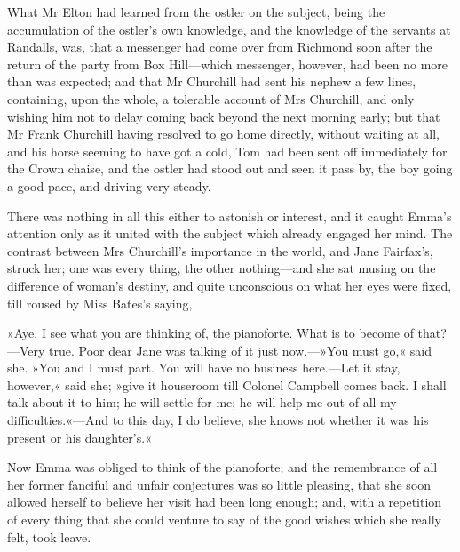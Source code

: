 What Mr Elton had learned from the ostler on the subject, being the accumulation of the ostler's own knowledge, and the knowledge of the servants at Randalls, was, that a messenger had come over from Richmond soon after the return of the party from Box Hill—which messenger, however, had been no more than was expected; and that Mr Churchill had sent his nephew a few lines, containing, upon the whole, a tolerable account of Mrs Churchill, and only wishing him not to delay coming back beyond the next morning early; but that Mr Frank Churchill having resolved to go home directly, without waiting at all, and his horse seeming to have got a cold, Tom had been sent off immediately for the Crown chaise, and the ostler had stood out and seen it pass by, the boy going a good pace, and driving very steady.

There was nothing in all this either to astonish or interest, and it caught Emma's attention only as it united with the subject which already engaged her mind. The contrast between Mrs Churchill's importance in the world, and Jane Fairfax's, struck her; one was every thing, the other nothing—and she sat musing on the difference of woman's destiny, and quite unconscious on what her eyes were fixed, till roused by Miss Bates's saying,

»Aye, I see what you are thinking of, the pianoforte. What is to become of that?—Very true. Poor dear Jane was talking of it just now.—»You must go,« said she. »You and I must part. You will have no business here.—Let it stay, however,« said she; »give it houseroom till Colonel Campbell comes back. I shall talk about it to him; he will settle for me; he will help me out of all my difficulties.«—And to this day, I do believe, she knows not whether it was his present or his daughter's.«

Now Emma was obliged to think of the pianoforte; and the remembrance of all her former fanciful and unfair conjectures was so little pleasing, that she soon allowed herself to believe her visit had been long enough; and, with a repetition of every thing that she could venture to say of the good wishes which she really felt, took leave.